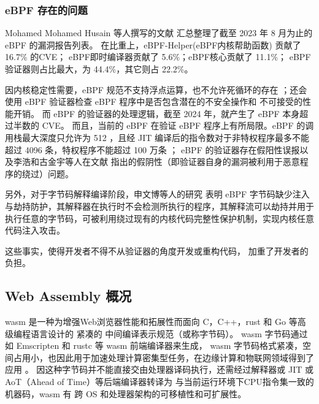     \subsubsection{eBPF 存在的问题}
        Mohamed Mohamed Husain 等人撰写的文献\parencite{mohamedUnderstandingSecurityLinux2023}
        汇总整理了截至 2023 年 8 月为止的 eBPF 的漏洞报告列表。
        在比重上，eBPF-Helper(eBPF内核帮助函数) 贡献了 16.7\% 的CVE；
        eBPF即时编译器贡献了 5.6\%；eBPF核心贡献了 11.1\%；
        eBPF验证器则占比最大，为 44.4\%，其它则占 22.2\%。
        
        因内核稳定性需要，eBPF 规范不支持浮点运算\cite{10.1145/3674213.3674219}，也不允许死循环的存在
        \cite{riceLearningEBPFProgramming2023}；还会使用 eBPF 验证器检查 eBPF 程序中是否包含潜在的不安全操作和
        不可接受的性能开销\cite{PKSeBPFIsolation}。
        而 eBPF 的验证器的处理逻辑，截至 2024 年，就产生了 eBPF 本身超过半数的 CVE\cite{hive}。
        而且，当前的 eBPF 在验证 eBPF 程序上有所局限。eBPF 的调用栈最大深度只允许为 512
        \cite[30]{riceLearningEBPFProgramming2023}，且经 JIT
        编译后的指令数对于非特权程序最多不能超过 4096 条，特权程序不能超过 100 万条
        \cite{limSafeBPFHardwareassistedDefenseindepth2024}；
        eBPF 的验证器存在假阳性误报\cite{hive, gershuniSimplePreciseStatic2019}以及李浩和古金宇等人在文献
        \parencite[2,5,6]{PKSeBPFIsolation}指出的假阴性（即验证器自身的漏洞被利用于恶意程序的绕过）问题。

        另外，对于字节码解释编译阶段，申文博等人的研究\parencite{interpreterhijeck}
        表明 eBPF 字节码缺少注入与劫持防护，其解释器在执行时不会检测所执行的程序，其解释流可以劫持并用于
        执行任意的字节码，可被利用绕过现有的内核代码完整性保护机制，实现内核任意代码注入攻击。


        这些事实，使得开发者不得不从验证器的角度开发\cite{PKSeBPFIsolation}或重构\cite{HaoValidating}代码，
        加重了开发者的负担。

\subsection{Web Assembly 概况}
    wasm 是一种为增强Web浏览器性能和拓展性而面向 C，C++，rust 和 Go 等高级编程语言设计的
    紧凑的\cite{yanUnderstandingPerformanceWebassembly2021,titzerFastInplaceInterpreter2022, Daniel2019DiscoveringVI}
    中间编译表示规范\cite{wasmCommunityGroup, lehmannWasabiFrameworkDynamically2019, lehmannEverythingOldNew, 
    bhansaliFirstLookCode2022, waseemIssuesTheirCauses2024}（或称字节码）。
    wasm 字节码通过如 Emscripten 和 rustc 等 wasm 前端编译器来生成\cite{romanoEmpiricalStudyBugs2021}，
    wasm 字节码格式紧凑，空间占用小，也因此用于加速处理计算密集型任务，在边缘计算和物联网领域得到了应用
    \cite{zhangResearchWebAssemblyRuntimes2024}。
    因这种字节码并不能直接交由处理器译码执行，还需经过解释器或 JIT 或 AoT（Ahead of Time）等后端编译器转译为
    与当前运行环境下CPU指令集一致的机器码\cite[6]{zhangResearchWebAssemblyRuntimes2024}，wasm 有
    跨 OS 和处理器架构的可移植性和可扩展性\cite{lehmannEverythingOldNew, waseemIssuesTheirCauses2024, 
        lehmannWasabiFrameworkDynamically2019, JayProvablySafe,  zhangResearchWebAssemblyRuntimes2024,
        WebAssemblySummaryOnSecurity, rayOverviewWebAssemblyIoT2023}。

